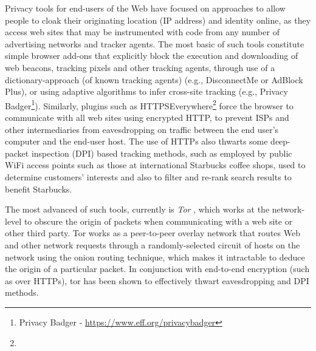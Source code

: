 \documentclass{IOS-Book-Article}     %
\begin{document}
Privacy tools for end-users of the Web have focused on approaches to allow people to cloak their originating location (IP address) and identity online, as they access web sites that may be instrumented with code from any number of advertising networks and tracker agents.  The most basic of such tools constitute simple browser add-ons that explicitly block the execution and downloading of web beacons, tracking pixels and other tracking agents, through use of a dictionary-approach (of known tracking agents) (e.g., DisconnectMe or AdBlock Plus), or using adaptive algorithms to infer cross-site tracking (e.g., Privacy Badger\footnote{Privacy Badger - \url{https://www.eff.org/privacybadger}}).  Similarly, plugins such as HTTPSEverywhere\footnote{} force the browser to communicate with all web sites using encrypted HTTP, to prevent ISPs and other intermediaries from eavesdropping on traffic between the end user's computer and the end-user host.  The use of HTTPs also thwarts some deep-packet inspection \cite{kumar2006advanced} (DPI) based tracking methods, such as employed by public WiFi access points such as those at international Starbucks coffee shops, used to determine customers' interests and also to filter and re-rank search results to benefit Starbucks.

The most advanced of such tools, currently is \emph{Tor} \cite{dingledine2004tor}, which works at the network-level to obscure the origin of packets when communicating with a web site or other third party.  Tor works as a peer-to-peer overlay network that routes Web and other network requests through a randomly-selected circuit of hosts on the network using the onion routing technique, which makes it intractable to deduce the origin of a particular packet.  In conjunction with end-to-end encryption (such as over HTTPs), tor has been shown to effectively thwart eavesdropping and DPI methods.
\end{document}

